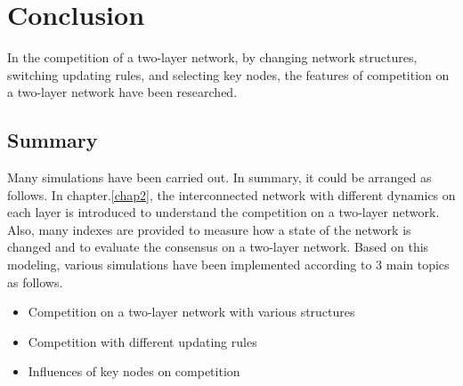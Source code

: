 
\chapter{Conclusion}
\label{chap6}
In the competition of a two-layer network, by changing network structures, switching updating rules, and selecting key nodes, the features of competition on a two-layer network have been researched.\\
 
\section{Summary}
Many simulations have been carried out. In summary, it could be arranged as follows. 
In chapter.\ref{chap2}, the interconnected network with different dynamics on each layer is introduced to understand the competition on a two-layer network.  Also, many indexes are provided to measure how a state of the network is changed and to evaluate the consensus on a two-layer network. Based on this modeling, various simulations have been implemented according to 3 main topics as follows.

\begin{itemize}
\item Competition on a two-layer network with various structures
\item Competition with different updating rules
\item Influences of key nodes on competition
\end{itemize}

